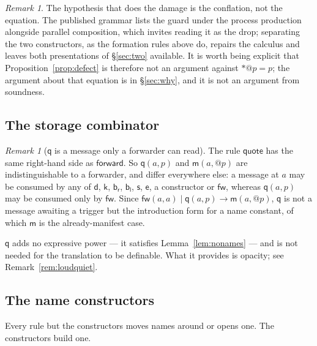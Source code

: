 \documentclass[11pt]{article}
\makeatletter
\theoremstyle{plain}
\theoremstyle{definition}
\theoremstyle{remark}
\newtheorem{remark}[theorem]{Remark}
\newcommand{\quo}[1]{@#1}
\newcommand{\drp}[1]{{*}#1}
\newcommand{\mm}{\mathsf{m}}
\newcommand{\dd}{\mathsf{d}}
\newcommand{\kk}{\mathsf{k}}
\newcommand{\fw}{\mathsf{fw}}
\newcommand{\bl}{\mathsf{b}_{\mathsf{l}}}
\newcommand{\br}{\mathsf{b}_{\mathsf{r}}}
\newcommand{\sy}{\mathsf{s}}
\newcommand{\ev}{\mathsf{e}}
\newcommand{\qq}{\mathsf{q}}
\newcommand{\red}{\longrightarrow}
\makeatother
\begin{document}
\begin{remark}
\label{rem:atom}
The hypothesis that does the damage is the conflation, not the equation. The
published grammar lists the guard under the process production alongside
parallel composition, which invites reading it as the drop; separating the
two constructors, as the formation rules above do, repairs the calculus and
leaves both presentations of \S\ref{sec:two} available. It is worth being
explicit that Proposition~\ref{prop:defect} is therefore not an argument
against $\drp{\quo{p}} = p$; the argument about that equation is in
\S\ref{sec:why}, and it is not an argument from soundness.
\end{remark}

\subsection{The storage combinator}
\label{sec:q}

\begin{remark}[$\qq$ is a message only a forwarder can read]
\label{rem:q}
The rule $\mathsf{quote}$ has the same right-hand side as
$\mathsf{forward}$. So $\qq(a,p)$ and $\mm(a,\quo{p})$ are indistinguishable
to a forwarder, and differ everywhere else: a message at $a$ may be consumed
by any of $\dd$, $\kk$, $\br$, $\bl$, $\sy$, $\ev$, a constructor or $\fw$,
whereas $\qq(a,p)$ may be consumed only by $\fw$. Since
$\fw(a,a) \mid \qq(a,p) \red \mm(a,\quo{p})$, $\qq$ is not a message awaiting
a trigger but the introduction form for a name constant, of which $\mm$ is
the already-manifest case.
\end{remark}

$\qq$ adds no expressive power --- it satisfies Lemma~\ref{lem:nonames} --- and
is not needed for the translation to be definable. What it provides is
opacity; see Remark~\ref{rem:loudquiet}.

\subsection{The name constructors}
\label{sec:cons}

Every rule but the constructors moves names around or opens one. The
constructors build one.
\end{document}
